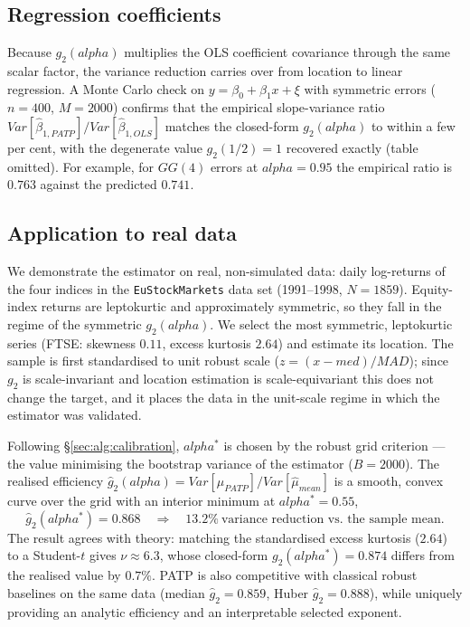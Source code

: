 \documentclass[11pt]{article}
\def\alpha{alpha}%
\def\mathrm#1{#1}%
\theoremstyle{definition}
\newcommand{\Var}{\mathrm{Var}}
\newcommand{\PATP}{\mathrm{PATP}}
\begin{document}
\subsection{Regression coefficients}\label{sec:ill:regression}

Because $g_2(\alpha)$ multiplies the OLS coefficient covariance through the same
scalar factor, the variance reduction carries over from location to linear
regression. A Monte Carlo check on $y=\beta_0+\beta_1 x+\xi$ with symmetric
errors ($n=400$, $M=2000$) confirms that the
empirical slope-variance ratio $\Var[\hat\beta_{1,\PATP}]/\Var[\hat\beta_{1,\mathrm{OLS}}]$
matches the closed-form $g_2(\alpha)$ to within a few per cent, with the
degenerate value $g_2(1/2)=1$ recovered exactly (table omitted). For example, for $\mathrm{GG}(4)$ errors at
$\alpha=0.95$ the empirical ratio is $0.763$ against the predicted $0.741$.

\subsection{Application to real data}\label{sec:ill:realdata}

We demonstrate the estimator on real, non-simulated data: daily log-returns of
the four indices in the \texttt{EuStockMarkets} data set (1991--1998,
$N=1859$). Equity-index returns are leptokurtic and approximately symmetric, so
they fall in the regime of the symmetric $g_2(\alpha)$. We select the most
symmetric, leptokurtic series (FTSE: skewness $0.11$, excess kurtosis $2.64$)
and estimate its location. The sample is first standardised to unit robust scale
($z=(x-\mathrm{med})/\mathrm{MAD}$); since $g_2$ is scale-invariant and location
estimation is scale-equivariant this does not change the target, and it places
the data in the unit-scale regime in which the estimator was validated.

Following \S\ref{sec:alg:calibration}, $\alpha^{*}$ is chosen by the robust grid
criterion --- the value minimising the bootstrap variance of the estimator
($B=2000$). The realised efficiency
$\hat g_2(\alpha)=\Var[\hat\mu_{\PATP}]/\Var[\hat\mu_{\mathrm{mean}}]$ is a smooth,
convex curve over the grid with an interior minimum at $\alpha^{*}=0.55$,
\[
  \hat g_2(\alpha^{*}) = 0.868
  \quad\Longrightarrow\quad 13.2\%\ \text{variance reduction vs.\ the sample mean.}
\]
The result agrees with theory: matching the standardised excess kurtosis
($2.64$) to a Student-$t$ gives $\nu\approx6.3$, whose closed-form
$g_2(\alpha^{*})=0.874$ differs from the realised value by $0.7\%$. PATP is also
competitive with classical robust baselines on the same data (median
$\hat g_2=0.859$, Huber $\hat g_2=0.888$), while uniquely providing an analytic
efficiency and an interpretable selected exponent.
\end{document}
